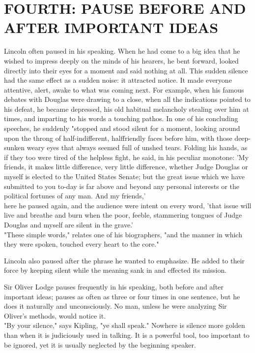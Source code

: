 \documentclass[10pt]{article}
\begin{document}
\section*{FOURTH: PAUSE BEFORE AND AFTER IMPORTANT IDEAS}
Lincoln often paused in his speaking. When he had come to a big idea that he wished to impress deeply on the minds of his hearers, he bent forward, looked directly into their eyes for a moment and said nothing at all. This sudden silence had the same effect as a sudden noise: it attracted notice. It made everyone attentive, alert, awake to what was coming next. For example, when his famous debates with Douglas were drawing to a close, when all the indications pointed to his defeat, he became depressed, his old habitual melancholy stealing over him at times, and imparting to his words a touching pathos. In one of his concluding speeches, he suddenly "stopped and stood silent for a moment, looking around upon the throng of half-indifferent, halffriendly faces before him, with those deep-sunken weary eyes that always seemed full of unshed tears. Folding his hands, as if they too were tired of the helpless fight, he said, in his peculiar monotone: 'My friends, it makes little difference, very little difference, whether Judge Douglas or myself is elected to the United States Senate; but the great issue which we have submitted to you to-day is far above and beyond any personal interests or the political fortunes of any man. And my friends,'\\
here he paused again, and the audience were intent on every word, 'that issue will live and breathe and burn when the poor, feeble, stammering tongues of Judge Douglas and myself are silent in the grave.'\\
"These simple words," relates one of his biographers, "and the manner in which they were spoken, touched every heart to the core."

Lincoln also paused after the phrase he wanted to emphasize. He added to their force by keeping silent while the meaning sank in and effected its mission.

Sir Oliver Lodge pauses frequently in his speaking, both before and after important ideas; pauses as often as three or four times in one sentence, but he does it naturally and unconsciously. No man, unless he were analyzing Sir Oliver's methods, would notice it.\\
"By your silence," says Kipling, "ye shall speak." Nowhere is silence more golden than when it is judiciously used in talking. It is a powerful tool, too important to be ignored, yet it is usually neglected by the beginning speaker.
\end{document}
